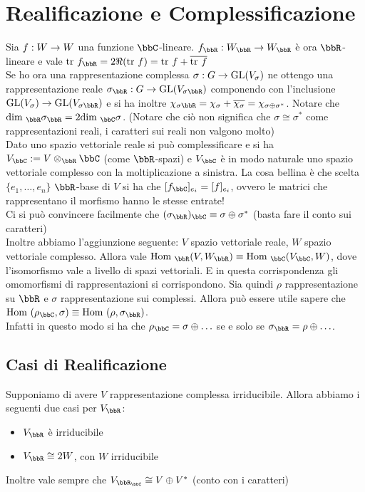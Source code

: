 \documentclass[a4paper,NoNotes,GeneralMath]{stdmdoc}
\newcommand{\Hom}{\text{Hom }}
\begin{document}
	\section{Realificazione e Complessificazione}
	Sia $f: W \rightarrow W$ una funzione $\bbC$-lineare. $f_\bbR: W_\bbR \rar W_\bbR$ è ora $\bbR$-lineare e vale $\Tr f_\bbR = 2 \Re(\Tr f) = \Tr f + \overline{\Tr f}$ \\
	Se ho ora una rappresentazione complessa $\sigma: G \rightarrow \mbox{GL}(V_\sigma)$ ne ottengo una rappresentazione reale $\sigma_\bbR: G \rar \GL(V_{\sigma \bbR})$ componendo con l'inclusione $\GL(V_\sigma) \rar \GL(V_{\sigma \bbR})$ e si ha inoltre $\chi_{\sigma \bbR} = \chi_\sigma + \overline{\chi_\sigma} = \chi_{\sigma \oplus \sigma^{*}}$. Notare che $\Dim_\bbR \sigma_\bbR = 2 \Dim_\bbC \sigma$. (Notare che ciò non significa che $\sigma \cong \sigma^{*}$ come rappresentazioni reali, i caratteri sui reali non valgono molto) \\
	Dato uno spazio vettoriale reale si può complessificare e si ha $V_\bbC := V \otimes_\bbR \bbC$ (come $\bbR$-spazi) e $V_\bbC$ è in modo naturale uno spazio vettoriale complesso con la moltiplicazione a sinistra. La cosa bellina è che scelta $\{ e_1, \ldots, e_n \}$ $\bbR$-base di $V$ si ha che $[f_\bbC]_{e_i} = [f]_{e_i}$, ovvero le matrici che rappresentano il morfismo hanno le stesse entrate! \\
	Ci si può convincere facilmente che $(\sigma_\bbR)_\bbC \equiv \sigma \oplus \sigma^{*}$ (basta fare il conto sui caratteri) \\
	Inoltre abbiamo l'aggiunzione seguente: $V$ spazio vettoriale reale, $W$ spazio vettoriale complesso. Allora vale $\Hom_\bbR(V, W_\bbR) \equiv \Hom_\bbC(V_\bbC, W)$, dove l'isomorfismo vale a livello di spazi vettoriali. E in questa corrispondenza gli omomorfismi di rappresentazioni si corrispondono.
	Sia quindi $\rho$ rappresentazione su $\bbR$ e $\sigma$ rappresentazione sui complessi. Allora può essere utile sapere che $\Hom (\rho_\bbC, \sigma) \equiv \Hom (\rho, \sigma_\bbR)$. \\
	Infatti in questo modo si ha che $\rho_\bbC = \sigma \oplus \ldots$ se e solo se $\sigma_\bbR = \rho \oplus \ldots$. \\
	
	\subsection*{Casi di Realificazione}
	Supponiamo di avere $V$ rappresentazione complessa irriducibile. Allora abbiamo i seguenti due casi per $V_\bbR$:
	\begin{itemize}
		\item $V_\bbR$ è irriducibile
		\item $V_\bbR \cong 2 W$, con $W$ irriducibile
	\end{itemize}
	Inoltre vale sempre che $V_{\bbR_\bbC} \cong V \oplus V^{*}$ (conto con i caratteri)
	
\end{document}
